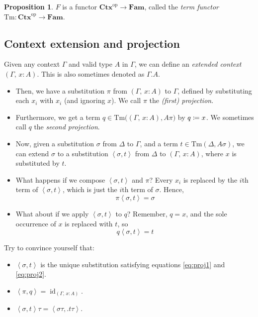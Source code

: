 \documentclass{article}
\theoremstyle{definition}
\newtheorem{proposition}[definition]{Proposition}
\newcommand{\comp}[2]{#2#1}%
\newcommand{\substType}[2]{#2#1}%
\newcommand{\substTerm}[2]{#2#1}%
\newcommand{\extsub}[2]{\ang{#1,#2}}
\newcommand{\C}{\mathbf{Ctx}}
\newcommand{\Fam}{\mathbf{Fam}}
\newcommand{\Tm}{\mathrm{Tm}}
\newcommand{\op}[1]{{#1}^\mathrm{op}}           %
\DeclareMathOperator{\id}{id}				    %
\newcommand{\defeq}{
	\mathrel{\mathrel{\mathop:}\mkern-1.2mu=}}	%
\newcommand{\ang}[1]{\mathopen{}\left\langle #1 \right\rangle\mathclose{}}
\begin{document}
\begin{proposition}
    $F$ is a functor $\op{\C} \to \Fam$, called the \textit{term functor} $\Tm\colon \op{\C} \to \Fam$.
\end{proposition}


\subsection{Context extension and projection}

Given any context $\Gamma$ and valid type $A$ in $\Gamma$, we can define an \textit{extended context} $(\Gamma,\, x : A)$. This is also sometimes denoted as $\Gamma.A$.

\begin{itemize}
    \item Then, we have a substitution $\pi$ from $(\Gamma,\, x : A)$ to $\Gamma$, defined by substituting each $x_i$ with $x_i$ (and ignoring $x$). We call $\pi$ the \textit{(first) projection}.

    \item Furthermore, we get a term $q \in \Tm \big( (\Gamma,\, x : A), \substType{\pi}{A} \big)$ by $q \defeq x$. We sometimes call $q$ the \textit{second projection}.

    \item Now, given a substitution $\sigma$ from $\Delta$ to $\Gamma$, and a term $t \in \Tm(\Delta, \substType{\sigma}{A})$, we can extend $\sigma$ to a substitution $\extsub{\sigma}{t}$ from $\Delta$ to $(\Gamma,\, x : A)$, where $x$ is substituted by $t$.

    \item What happens if we compose $\extsub{\sigma}{t}$ and $\pi$? Every $x_i$ is replaced by the $i$th term of $\extsub{\sigma}{t}$, which is just the $i$th term of $\sigma$. Hence,
    \begin{equation}\label{eq:proj1}
        \comp{\extsub{\sigma}{t}}{\pi} = \sigma
    \end{equation}

    \item What about if we apply $\extsub{\sigma}{t}$ to $q$? Remember, $q = x$, and the sole occurrence of $x$ is replaced with $t$, so
    \begin{equation}\label{eq:proj2}
        \substTerm{\extsub{\sigma}{t}}{q} = t
    \end{equation}
\end{itemize}
    
\noindent Try to convince yourself that:
\begin{itemize}
    \item $\extsub{\sigma}{t}$ is the unique substitution satisfying equations \eqref{eq:proj1} and \eqref{eq:proj2}.
    
    \item $\extsub{\pi}{q} = \id_{(\Gamma,\, x : A)}$.
    
    \item $\comp{\tau}{\extsub{\sigma}{ t}} = \extsub{ \comp{\tau}{\sigma}}{\big. \substTerm{\tau}{t}}$.
\end{itemize}
\end{document}
